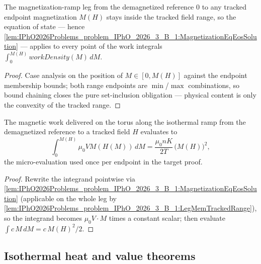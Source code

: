 \begin{lemma}
\label{lem:IPhO2026Problems_problem_IPhO_2026_3_B_1:LegMemTrackedRange}
The magnetization-ramp leg from the demagnetized reference $0$ to any
tracked endpoint magnetization $M(H)$ stays inside the tracked field range,
so the equation of state --- hence
\cref{lem:IPhO2026Problems_problem_IPhO_2026_3_B_1:MagnetizationEqEosSolution}
--- applies to every point of the work integrals
$\int_{0}^{M(H)} \mathit{workDensity}(M)\,dM$.
\end{lemma}
\begin{proof}
Case analysis on the position of $M \in [0, M(H)]$ against the endpoint
membership bounds; both range endpoints are $\min$/$\max$ combinations, so
bound chaining closes the pure set-inclusion obligation --- physical
content is only the convexity of the tracked range.
\end{proof}

\begin{lemma}
\label{lem:IPhO2026Problems_problem_IPhO_2026_3_B_1:LegWorkIntegralEval}
The magnetic work delivered on the torus along the isothermal ramp from the
demagnetized reference to a tracked field $H$ evaluates to
\[
\int_{0}^{M(H)} \mu_0 V M(H(M))\,dM
= \frac{\mu_0 n K}{2 T}\,\bigl(M(H)\bigr)^2 ,
\]
the micro-evaluation used once per endpoint in the target proof.
\end{lemma}
\begin{proof}
Rewrite the integrand pointwise via
\cref{lem:IPhO2026Problems_problem_IPhO_2026_3_B_1:MagnetizationEqEosSolution}
(applicable on the whole leg by
\cref{lem:IPhO2026Problems_problem_IPhO_2026_3_B_1:LegMemTrackedRange}),
so the integrand becomes $\mu_0 V \cdot M$ times a constant scalar; then
evaluate $\int c\,M\,dM = c\,M(H)^2/2$.
\end{proof}

\subsection*{Isothermal heat and value theorems}

